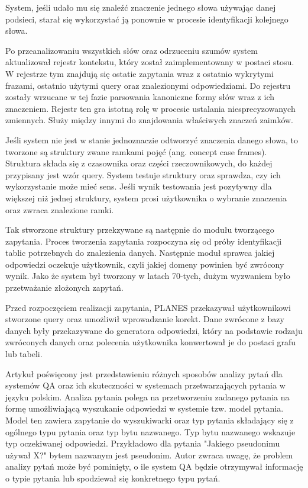 System, jeśli udało mu się znaleźć znaczenie jednego słowa używając danej podsieci, starał się wykorzystać ją ponownie w procesie identyfikacji kolejnego słowa.

Po przeanalizowaniu wszystkich słów oraz odrzuceniu szumów system aktualizował rejestr kontekstu, który został zaimplementowany w postaci stosu. W rejestrze tym znajdują się ostatie zapytania wraz z ostatnio wykrytymi frazami, ostatnio użytymi query oraz znalezionymi odpowiedziami. Do rejestru zostały wrzucane w tej fazie parsowania kanoniczne formy słów wraz z ich znaczeniem. Rejestr ten gra istotną rolę w procesie ustalania niesprecyzowanych zmiennych. Służy między innymi do znajdowania właściwych znaczeń zaimków.

Jeśli system nie jest w stanie jednoznaczie odtworzyć znaczenia danego słowa, to tworzone są struktury zwane ramkami pojęć (ang. concept case frames). Struktura składa się z czasownika oraz części rzeczownikowych, do każdej przypisany jest wzór query. System testuje struktury oraz sprawdza, czy ich wykorzystanie może mieć sens. Jeśli wynik testowania jest pozytywny dla większej niż jednej struktury, system prosi użytkownika o wybranie znaczenia oraz zwraca znalezione ramki.

Tak stworzone struktury przekzywane są następnie do modułu tworzącego zapytania. Proces tworzenia zapytania rozpoczyna się od próby identyfikacji tablic potrzebnych do znalezienia danych. Następnie moduł sprawca jakiej odpowiedzi oczekuje użytkownik, czyli jakiej domeny powinien być zwrócony wynik. Jako że system był tworzony w latach 70-tych, dużym wyzwaniem było przetważanie złożonych zapytań.

Przed rozpoczęciem realizacji zapytania, PLANES przekazywał użytkownikowi stworzone query oraz umożliwił wprowadzanie korekt. Dane zwrócone z bazy danych były przekazywane do generatora odpowiedzi, który na podstawie rodzaju zwróconych danych oraz polecenia użytkownika konwertował je do postaci grafu lub tabeli\cite{waltz1978english}.

Artykuł \cite{przybyla-2013-question} poświęcony jest przedstawieniu różnych sposobów analizy pytań dla systemów QA oraz ich skuteczności w systemach przetwarzających pytania w języku polskim. Analiza pytania polega na przetworzeniu zadanego pytania na formę umożliwiającą wyszukanie odpowiedzi w systemie tzw. model pytania. Model ten zawiera zapytanie do wyszukiwarki oraz typ pytania składający się z ogólnego typu pytania oraz typ bytu nazwanego. Typ bytu nazwanego wskazuje typ oczekiwanej odpowiedzi. Przykładowo dla pytania "Jakiego pseudonimu używał X?" bytem nazwanym jest pseudonim. Autor zwraca uwagę, że problem analizy pytań może być pominięty, o ile system QA będzie otrzymywał informację o typie pytania lub spodziewał się konkretnego typu pytań.

